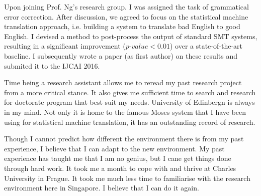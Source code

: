\documentclass[a4paper, 12pt]{scrartcl}
\begin{document}
Upon joining Prof. Ng's research group. I was assigned the task of grammatical error correction.
After discussion, we agreed to focus on the statistical machine translation approach, i.e. building a system to translate bad English to good English. 
I devised a method to post-process the output of standard SMT systems, resulting in a significant improvement ($p\mbox{-}value < 0.01$) over a state-of-the-art baseline. 
I subsequently wrote a paper (as first author) on these results and submited it to the IJCAI 2016.  

Time being a research assistant allows me to reread my past research project from a more critical stance. It also gives me sufficient time to search and research for doctorate program that best suit my needs.
University of Edinbergn is always in my mind. Not only it is home to the famous Moses system that I have been using for statistical machine translation, it has an outstanding record of research.

Though I cannot predict how different the environment there is from my past experience, I believe that I can adapt to the new environment. 
My past experience has taught me that I am no genius, but I cane get things done through hard work.
It took me a month to cope with and thrive at Charles University in Prague.
It took me much less time to familiarise with the research environment here in Singapore.
I believe that I can do it again. 
\end{document}
